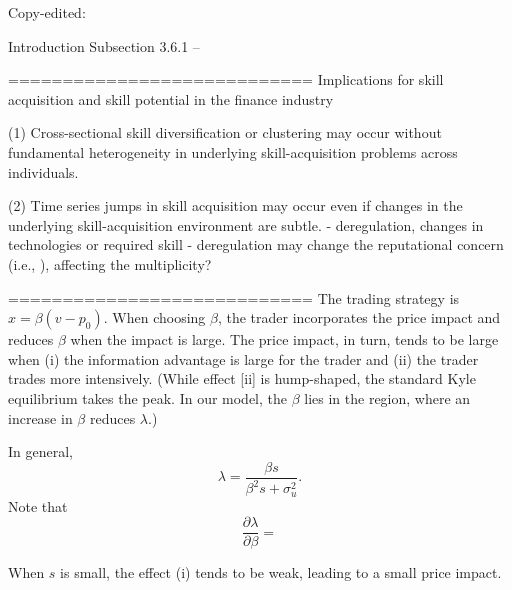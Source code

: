 Copy-edited:

Introduction
Subsection 3.6.1 -- 



============================
Implications for skill acquisition and skill potential in the finance industry

(1) Cross-sectional skill diversification or clustering may occur without fundamental heterogeneity in underlying skill-acquisition problems across individuals.

(2) Time series jumps in skill acquisition may occur even if changes in the underlying skill-acquisition environment are subtle.
- deregulation, changes in technologies or required skill
- deregulation may change the reputational concern (i.e., \theta), affecting the multiplicity?



============================
The trading strategy is $x=\beta(v-p_{0})$. When choosing $\beta$, the trader incorporates the price impact and reduces $\beta$ when the impact is large. The price impact, in turn, tends to be large when (i) the information advantage is large for the trader and (ii) the trader trades more intensively. (While effect [ii] is hump-shaped, the standard Kyle equilibrium takes the peak. In our model, the $\beta$ lies in the region, where an increase in $\beta$ reduces $\lambda$.)

In general, $$\lambda  = \frac{\beta s}{\beta^2 s + \sigma_{u}^2}.$$ Note that $$\frac{\partial \lambda}{\partial \beta} = $$

When $s$ is small, the effect (i) tends to be weak, leading to a small price impact.  


